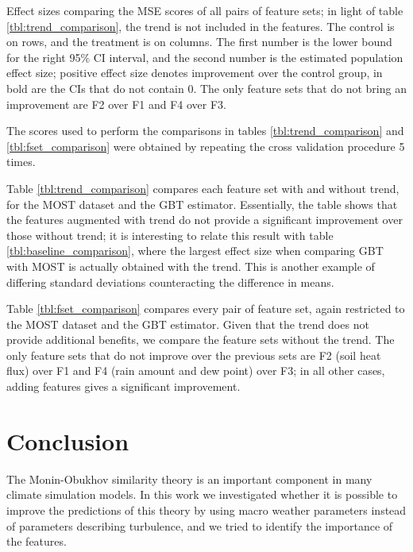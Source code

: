 \documentclass[a4paper]{book}
\begin{document}
\begin{table}[p]
\caption{Effect sizes comparing the MSE scores of all pairs of feature sets; in light of table \ref{tbl:trend_comparison}, the trend is not included in the features. The control is on rows, and the treatment is on columns. The first number is the lower bound for the right 95\% CI interval, and the second number is the estimated population effect size; positive effect size denotes improvement over the control group, in bold are the CIs that do not contain 0. The only feature sets that do not bring an improvement are F2 over F1 and F4 over F3.}
\label{tbl:fset_comparison}

\end{table}

The scores used to perform the comparisons in tables \ref{tbl:trend_comparison} and \ref{tbl:fset_comparison} were obtained by repeating the cross validation procedure 5 times.

Table \ref{tbl:trend_comparison} compares each feature set with and without trend, for the MOST dataset and the GBT estimator. Essentially, the table shows that the features augmented with trend do not provide a significant improvement over those without trend; it is interesting to relate this result with table \ref{tbl:baseline_comparison}, where the largest effect size when comparing GBT with MOST is actually obtained with the trend. This is another example of differing standard deviations counteracting the difference in means.

Table \ref{tbl:fset_comparison} compares every pair of feature set, again restricted to the MOST dataset and the GBT estimator. Given that the trend does not provide additional benefits, we compare the feature sets without the trend. The only feature sets that do not improve over the previous sets are F2 (soil heat flux) over F1 and F4 (rain amount and dew point) over F3; in all other cases, adding features gives a significant improvement.

\chapter{Conclusion}
\label{ch:conclusion}
The Monin-Obukhov similarity theory is an important component in many climate simulation models. In this work we investigated whether it is possible to improve the predictions of this theory by using macro weather parameters instead of parameters describing turbulence, and we tried to identify the importance of the features.
\end{document}
